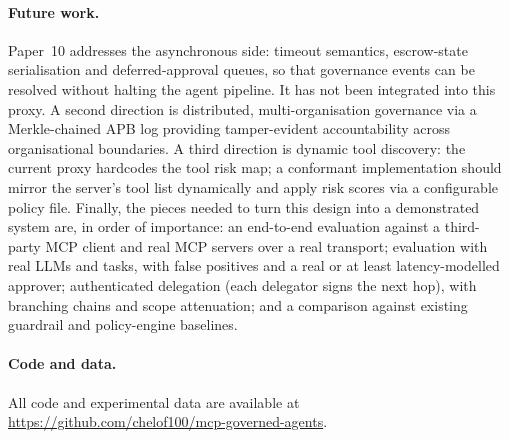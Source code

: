 \documentclass[11pt]{article}
\begin{document}
\paragraph{Future work.}
Paper~10 \citep{fernandez2026nbg} addresses the asynchronous side:
timeout semantics, escrow-state serialisation and deferred-approval
queues, so that governance events can be resolved without halting the
agent pipeline. It has not been integrated into this proxy.
A second direction is distributed, multi-organisation governance
via a Merkle-chained APB log providing tamper-evident accountability
across organisational boundaries.
A third direction is dynamic tool discovery: the current proxy
hardcodes the tool risk map; a conformant implementation should mirror
the server's tool list dynamically and apply risk scores via a
configurable policy file.
Finally, the pieces needed to turn this design into a demonstrated
system are, in order of importance: an end-to-end evaluation against a
third-party MCP client and real MCP servers over a real transport;
evaluation with real LLMs and tasks, with false positives and a real
or at least latency-modelled approver; authenticated delegation (each
delegator signs the next hop), with branching chains and scope
attenuation; and a comparison against existing guardrail and
policy-engine baselines.

\paragraph{Code and data.}
All code and experimental data are available at
\url{https://github.com/chelof100/mcp-governed-agents}.



\end{document}
